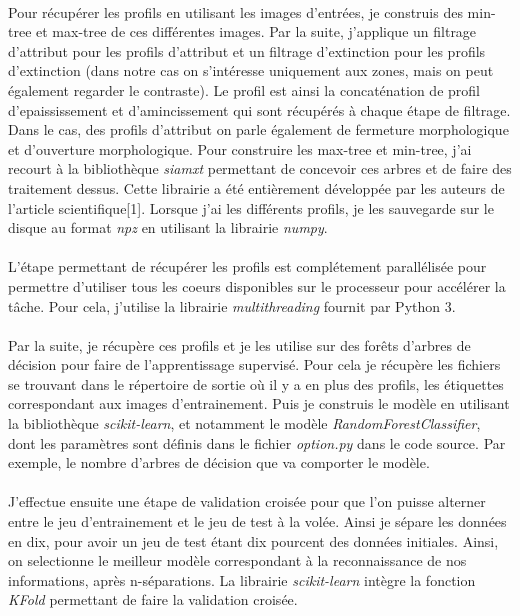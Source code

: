 \documentclass[paper=a4, 11pt]{article}
\begin{document}
\paragraph{} Pour récupérer les profils en utilisant les images d'entrées, je construis des min-tree et max-tree de ces différentes images. Par la suite, j'applique un filtrage d'attribut pour les profils d'attribut et un filtrage d'extinction pour les profils d'extinction (dans notre cas on s'intéresse uniquement aux zones, mais on peut également regarder le contraste). Le profil est ainsi la concaténation de profil d'epaississement et d'amincissement qui sont récupérés à chaque étape de filtrage. Dans le cas, des profils d'attribut on parle également de fermeture morphologique et d'ouverture morphologique. Pour construire les max-tree et min-tree, j'ai recourt à la bibliothèque  \textit{siamxt}\cite{souza2017iamxt} permettant de concevoir ces arbres et de faire des traitement dessus. Cette librairie a été entièrement développée par les auteurs de l'article scientifique[1]. Lorsque j'ai les différents profils, je les sauvegarde sur le disque au format \textit{npz} en utilisant la librairie \textit{numpy}.

\paragraph{} L'étape permettant de récupérer les profils est complétement parallélisée pour permettre d'utiliser tous les coeurs disponibles sur le processeur pour accélérer la tâche. Pour cela, j'utilise la librairie \textit{multithreading} fournit par Python 3.

\paragraph{} Par la suite, je récupère ces profils et je les utilise sur des forêts d'arbres de décision pour faire de l'apprentissage supervisé. Pour cela je récupère les fichiers se trouvant dans le répertoire de sortie où il y a en plus des profils, les étiquettes correspondant aux images d'entrainement. Puis je construis le modèle en utilisant la bibliothèque \textit{scikit-learn}, et notamment le modèle \textit{RandomForestClassifier}, dont les paramètres sont définis dans le fichier \textit{option.py} dans le code source. Par exemple, le nombre d'arbres de décision que va comporter le modèle.

\paragraph{} J'effectue ensuite une étape de validation croisée pour que l'on puisse alterner entre le jeu d'entrainement et le jeu de test à la volée. Ainsi je sépare les données en dix, pour avoir un jeu de test étant dix pourcent des données initiales. Ainsi, on selectionne le meilleur modèle correspondant à la reconnaissance de nos informations, après n-séparations. La librairie \textit{scikit-learn} intègre la fonction \textit{KFold} permettant de faire la validation croisée.
\end{document}

